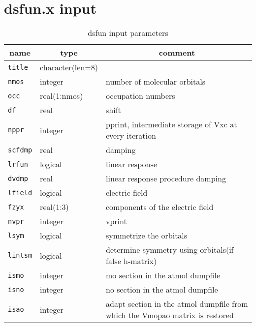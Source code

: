 \documentclass[10pt]{article}
\begin{document}
\section{dsfun.x input}        
    \begin{table}[H]
        \begin{center}
        \caption{\label{tab:dsfun-input}dsfun input parameters}
        \begin{tabular*}{0.6\textwidth}{lll}
        \toprule
        \multicolumn{1}{c}{name} & \multicolumn{1}{c}{type} & \multicolumn{1}{c}{comment} \\ \midrule
        \verb!title! & character(len=8) & \\
        \verb!nmos!  & integer & number of molecular orbitals \\
        \verb!occ!   & real(1:nmos) & occupation numbers \\
        \verb!df!    & real & shift \\
        \verb!nppr!  & integer & pprint, intermediate storage of Vxc at every iteration \\
        \verb!scfdmp! & real & damping \\
        \verb!lrfun! & logical & linear response \\
        \verb!dvdmp! & real & linear response procedure damping \\
        \verb!lfield! & logical & electric field \\
        \verb!fzyx! & real(1:3) & components of the electric field \\
        \verb!nvpr! & integer & vprint \\
        \verb!lsym! & logical & symmetrize the orbitals \\
        \verb!lintsm! & logical & determine symmetry using orbitals(if false h-matrix) \\
        \verb!ismo! & integer & mo section in the atmol dumpfile \\
        \verb!isno! & integer & no section in the atmol dumpfile \\
        \verb!isao! & integer & adapt section in the atmol dumpfile from which the Vmopao matrix is restored \\
        \bottomrule
        \end{tabular*}
        \end{center}
    \end{table}
\end{document}
